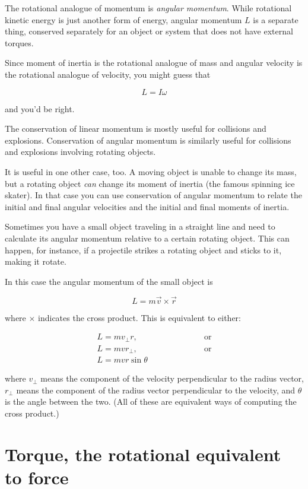 \documentclass[10pt]{article}
\begin{document}
The rotational analogue of momentum is {\it angular momentum}. While rotational kinetic energy is just another form of energy, angular momentum $L$ is a separate thing, conserved separately for an object or system that does not have external torques.

Since moment of inertia is the rotational analogue of mass and angular velocity is the rotational analogue of velocity, you might guess that 

$$L = I \omega$$

and you'd be right.

The conservation of linear momentum is mostly useful for collisions and explosions. Conservation of angular momentum is similarly useful for collisions and explosions involving rotating objects. 

It is useful in one other case, too. A moving object is unable to change its mass, but a rotating object {\it can} change its moment of inertia (the famous spinning ice skater). In that case you can use conservation of angular momentum to relate the initial and final angular velocities and the initial and final moments of inertia.

Sometimes you have a small object traveling in a straight line and need to calculate its angular momentum relative to a certain rotating object. This can happen, for instance, if a projectile strikes a rotating object and sticks to it, making it rotate.

In this case the angular momentum of the small object is 

$$L = m \vec v \times \vec r$$

where $\times$ indicates the cross product. This is equivalent to either:

\begin{align*}
L=mv_\perp r, &\hspace{1in} \text{or}\\
L=mvr_\perp, &\hspace{1in} \text{or}\\
L=mvr \sin \theta
\end{align*}

where $v_\perp$ means the component of the velocity perpendicular to the radius vector, $r_\perp$ means the component of the radius vector perpendicular to the velocity, and $\theta$ is the angle between the two. (All of these are equivalent ways of computing the cross product.)

\section{Torque, the rotational equivalent to force}
\end{document}
